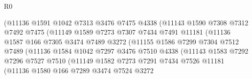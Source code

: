 \begin{lexlean}{R0}
\begin{coremodule}
                            (@11136
                              @1591
                              @1042
                              @7313
                              @3476
                              @7475
                              @4338
                              (@11143
                                @1590
                                @7308
                                @7312
                                @7492
                                @7475
                                (@11149
                                  @1589
                                  @7273
                                  @7307
                                  @7434
                                  @7491
                                  @11181
                                  (@11136
                                    @1587
                                    @166
                                    @7305
                                    @3474
                                    @7489
                                    @3272
                                    (@11155
                                      @1586
                                      @7299
                                      @7304
                                      @7512
                                      @7489
                                      (@11136
                                        @1584
                                        @1042
                                        @7297
                                        @3476
                                        @7510
                                        @4338
                                        (@11143
                                          @1583
                                          @7292
                                          @7296
                                          @7527
                                          @7510
                                          (@11149
                                            @1582
                                            @7273
                                            @7291
                                            @7434
                                            @7526
                                            @11181
                                            (@11136
                                              @1580
                                              @166
                                              @7289
                                              @3474
                                              @7524
                                              @3272

\end{coremodule}
\end{lexlean}
